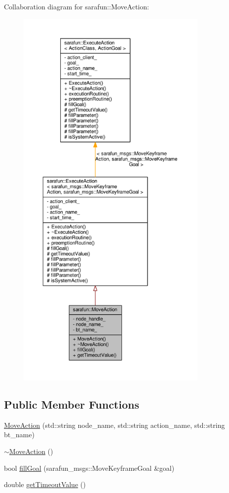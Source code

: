 Collaboration diagram for sarafun\-:\-:Move\-Action\-:
\nopagebreak
\begin{figure}[H]
\begin{center}
\leavevmode
\includegraphics[height=550pt]{dd/d62/classsarafun_1_1MoveAction__coll__graph}
\end{center}
\end{figure}
\subsection*{Public Member Functions}
\begin{DoxyCompactItemize}
\item 
\hyperlink{classsarafun_1_1MoveAction_a423d16aa9d5a47e9f558eae9e013c5e7_a423d16aa9d5a47e9f558eae9e013c5e7}{Move\-Action} (std\-::string node\-\_\-name, std\-::string action\-\_\-name, std\-::string bt\-\_\-name)
\item 
\hyperlink{classsarafun_1_1MoveAction_ab9b7f0e483bd9a0b53f9651d661c93b7_ab9b7f0e483bd9a0b53f9651d661c93b7}{$\sim$\-Move\-Action} ()
\item 
bool \hyperlink{classsarafun_1_1MoveAction_ad5259389b6a5718389c24fab920c9296_ad5259389b6a5718389c24fab920c9296}{fill\-Goal} (sarafun\-\_\-msgs\-::\-Move\-Keyframe\-Goal \&goal)
\item 
double \hyperlink{classsarafun_1_1MoveAction_a3a0d4d2919b30b878c603a884db6a470_a3a0d4d2919b30b878c603a884db6a470}{get\-Timeout\-Value} ()
\end{DoxyCompactItemize}
